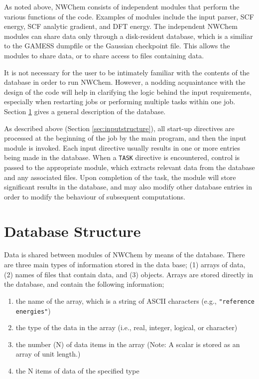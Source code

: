 \label{sec:arch}

As noted above, NWChem consists of independent modules that perform
the various functions of the code.  Examples of modules include the
input parser, SCF energy, SCF analytic gradient, and DFT energy.  The
independent NWChem modules can share data only through a disk-resident
database, which is a similiar to the GAMESS dumpfile or the Gaussian
checkpoint file.  This allows the modules to share data, or to share
access to files containing data.

It is not necessary for the user to be intimately familiar with the
contents of the database in order to run NWChem.  However, a nodding
acquaintance with the design of the code will help in clarifying the
logic behind the input requirements, especially when restarting jobs
or performing multiple tasks within one job.  Section
\ref{sec:database} gives a general description of the database.

As described above (Section \ref{sec:inputstructure}), all
start-up directives are processed at the beginning of the job
by the main program, and
then the input module is invoked.  Each input directive usually
results in one or more entries being made in the database.  When a
\verb+TASK+ directive is encountered, control is passed to the
appropriate module, which extracts relevant data from the database and
any associated files.  Upon completion of the task, the module will store
significant results in the database, and may also modify other
database entries in order to modify the behaviour of subsequent
computations.

\section{Database Structure}
\label{sec:database}

\sloppy

Data is shared between modules of NWChem by means of the database.  There
are three main types of information stored in the data base; (1) arrays of
data, (2) names of files that contain data, and (3) objects.  
Arrays are stored directly in the database, and contain the following
information;
\begin{enumerate}
\item the name of the array, which is a string of ASCII characters (e.g., 
      \verb+"reference energies"+)
\item the type of the data in the array 
(i.e., real, integer, logical, or character) 
\item the number (N) of data items in the array (Note: A scalar is stored as an array of unit length.)
\item the N items of data of the specified type
\end{enumerate}

